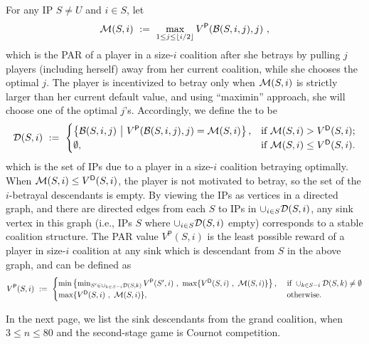 \documentclass[11pt]{article}
\newcommand{\vp}{V^{\textsf{P}}}
\newcommand{\vd}{V^{\textsf{D}}}
\begin{document}
For any IP $S\neq U$ and $i\in S$, let
\[
\calM(S,i) ~:=~ \max_{1\le j \le \floor{i/2}} \vp(\calB(S,i,j),j)~,
\]
which is the PAR of a player in a size-$i$ coalition after she betrays by pulling $j$ players (including herself) away from her current coalition,
while she chooses the optimal $j$. The player is incentivized to betray only when $\mathcal{M}(S,i)$ is strictly larger than her current default value,
and using ``maximin'' approach, she will choose one of the optimal $j$'s. Accordingly, we define the  to be
\[
\calD(S,i) ~:=~ 
\begin{cases}
\left\{ \calB(S,i,j) ~\big|~ \vp(\calB(S,i,j),j) = \calM(S,i) \right\}, & \text{if } \calM(S,i) > \vd(S,i);\\
\emptyset, & \text{if } \calM(S,i) \le \vd(S,i).
\end{cases}
\]
which is the set of IPs due to a player in a size-$i$ coalition betraying optimally.
When $\calM(S,i) \le \vd(S,i)$, the player is not motivated to betray, so the set of the $i$-betrayal descendants is empty.
By viewing the IPs as vertices in a directed graph, and there are directed edges from each $S$ to IPs in $\cup_{i\in S} \mathcal{D}(S,i)$,
any sink vertex in this graph (i.e., IPs $S$ where $\cup_{i\in S} \mathcal{D}(S,i)$ empty) corresponds to a stable coalition structure.
The PAR value $\vp(S,i)$ is the least possible reward of a player in size-$i$ coalition at any sink which is descendant from $S$ in the above graph,
and can be defined as
\[
\vp(S,i) ~:=~ 
\begin{cases}
\min \left\{ \min_{S'\in \cup_{k\in S-i}\calD(S,k)} \vp(S',i) ~,~ \max\{\vd(S,i)~,~\calM(S,i)\} \right\}, & \text{ if }\cup_{k\in S-i}\calD(S,k)\neq \emptyset\\
\max\{\vd(S,i)~,~\calM(S,i)\}, & \text{ otherwise.}
\end{cases}
\]

In the next page, we list the sink descendants from the grand coalition, when $3\le n\le 80$ and the second-stage game is Cournot competition.

\newpage
\end{document}
